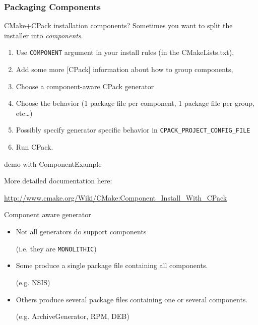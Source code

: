 \documentclass[compress,slidestop,table
              ]
               {beamer}
\newcommand{\fname}[1]{\texttt{#1}}
\begin{document}
\begin{frame}
\frametitle{Packaging Components}
\vspace*{-0.7cm}
\begin{block}{CMake+CPack installation components?}
Sometimes you want to split the installer into \emph{components}.
\end{block}
\vspace*{-0.7cm}
\begin{enumerate}
\item Use \fname{COMPONENT} argument in your install rules
      (in the CMakeLists.txt),
\item Add some more [CPack] information about how to group
      components,
\item Choose a component-aware CPack generator
\item Choose the behavior (1 package file per component, 1 package file
      per group, etc\ldots)
\item Possibly specify generator specific behavior in \fname{CPACK\_PROJECT\_CONFIG\_FILE}
\item Run CPack.
\end{enumerate}
\begin{center}
\alert{demo with ComponentExample}
\end{center}

More detailed documentation here:

{\scriptsize \url{http://www.cmake.org/Wiki/CMake:Component_Install_With_CPack}}
\begin{alertblock}{Component aware generator}
\begin{itemize}
\item Not all generators do support components

      (i.e. they are \fname{MONOLITHIC})
\item Some produce a single package file containing all components.

      (e.g. NSIS)
\item Others produce several package files containing one or several components.

      (e.g. ArchiveGenerator, RPM, DEB)
\end{itemize}
\end{alertblock}
\end{frame}


\end{document}
